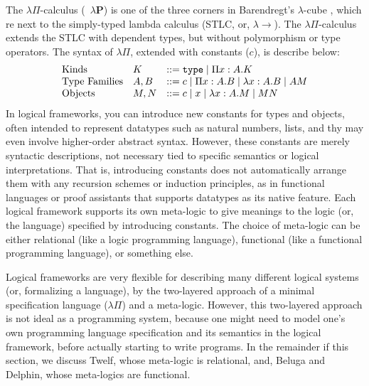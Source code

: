 The $\lambda\Pi$-calculus (\aka\ $\lambda\mathbf{P}$) is one of the three
corners in Barendregt's $\lambda$-cube \cite{Barendregt91}, which re
next to the simply-typed lambda calculus (STLC, or, $\lambda\!\!\rightarrow$).
The $\lambda\Pi$-calculus extends the STLC with dependent types,
but without polymorphism or type operators.
The syntax of $\lambda\Pi$, extended with constants ($c$), is describe below:
\[
\begin{array}{lll}
\text{Kinds}         & K   & ::= \texttt{type} \mid \Pi x:A.K
	\\
\text{Type Families} & A,B & ::= c \mid \Pi x:A.B \mid \lambda x:A.B \mid AM
	\\
\text{Objects}       & M,N & ::= c \mid x \mid \lambda x:A.M \mid MN
\end{array}
\]
In logical frameworks, you can introduce new constants for types and objects,
often intended to represent datatypes such as natural numbers, lists, and
thy may even involve higher-order abstract syntax. However, these constants
are merely syntactic descriptions, not necessary tied to specific 
semantics or logical interpretations. That is, introducing constants
does not automatically arrange them with any recursion schemes or
induction principles, as in functional languages or proof assistants
that supports datatypes as its native feature. Each logical framework
supports its own meta-logic to give meanings to the logic (or, the language)
specified by introducing constants. The choice of meta-logic can be either
relational (like a logic programming language),
functional (like a functional programming language), or something else.

Logical frameworks are very flexible for describing many
different logical systems (or, formalizing a language),
by the two-layered approach of a minimal specification language ($\lambda\Pi$)
and a meta-logic. However, this two-layered approach is not ideal
as a programming system, because one might need to model one's
own programming language specification and its semantics
in the logical framework, before actually starting to write programs.
In the remainder if this section, we discuss Twelf, whose meta-logic
is relational, and, Beluga and Delphin, whose meta-logics are functional.

